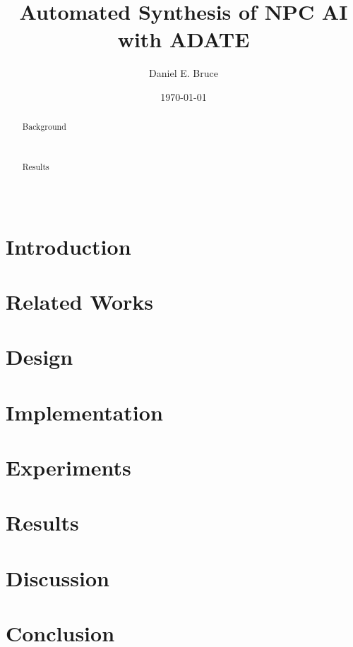 \documentclass[]{report}
\begin{document}
\title{Automated Synthesis of NPC AI with ADATE}
\author{Daniel E. Bruce}
\date{\today}
\maketitle

\begin{abstract}
  \begin{description}
    \item[Background] \hfill \\

    \item[Results] \hfill \\

  \end{description}
\end{abstract}

\tableofcontents

\chapter{Introduction}

\chapter{Related Works}
\label{sec:related-works}

\chapter{Design}
\label{sec:design}

\chapter{Implementation}
\label{sec:implementation}

\chapter{Experiments}
\label{sec:experiments}

\chapter{Results}
\label{sec:results}

\chapter{Discussion}
\label{cha:discussion}

\chapter{Conclusion}
\label{cha:conclusion}


{}

\end{document}
